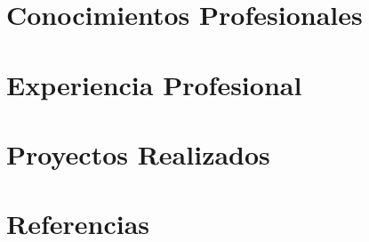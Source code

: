\documentclass[11pt,a4paper,sans]{moderncv}
\begin{document}
\maketitle






\section{Conocimientos Profesionales}








\section{Experiencia Profesional}


\section{Proyectos Realizados}


\section{Referencias}

      
\end{document}
